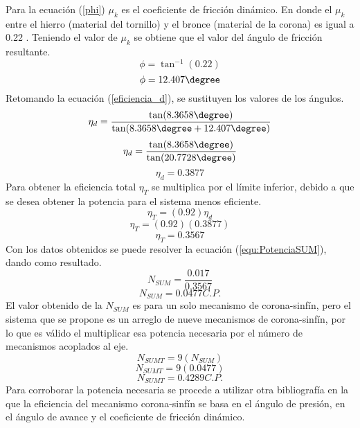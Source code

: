 Para la ecuación (\ref{phi})\hfill\break
$\mu_k$ es el coeficiente de fricción dinámico.\hfill\break
En donde el $\mu_k$ entre el hierro (material del tornillo) y el bronce (material de la corona) es igual a 0.22 \cite{Norton2011}. Teniendo el valor de $\mu_k$ se obtiene que el valor del ángulo de fricción resultante.
\begin{equation*}
    \phi=\tan^{-1}(0.22)
\end{equation*}
\begin{equation*}
    \phi=12.407\degree
\end{equation*}
Retomando la ecuación (\ref{eficiencia_d}), se sustituyen los valores de los ángulos.
\begin{equation*}
    \eta_d=\frac{\tan(8.3658\degree)}{\tan(8.3658\degree+12.407\degree)}
\end{equation*}
\begin{equation*}
    \eta_d=\frac{\tan(8.3658\degree)}{\tan(20.7728\degree)}
\end{equation*}
\begin{equation*}
    \eta_d=0.3877
\end{equation*}
Para obtener la eficiencia total $\eta_T$ se multiplica por el límite inferior, debido a que se desea obtener la potencia para el sistema menos eficiente.
\begin{equation*}
    \eta_T=(0.92)\eta_d
\end{equation*}
\begin{equation*}
    \eta_T=(0.92)(0.3877)
\end{equation*}
\begin{equation*}
    \eta_T=0.3567
\end{equation*}
Con los datos obtenidos se puede resolver la ecuación (\ref{equ:PotenciaSUM}), dando como resultado.
\begin{equation*}
    N_{SUM}=\frac{0.017}{0.3567}
\end{equation*}
\begin{equation*}
    N_{SUM}=0.0477 C.P.
\end{equation*}
El valor obtenido de la $N_{SUM}$ es para un solo mecanismo de corona-sinfín, pero el sistema que se propone es un arreglo de nueve mecanismos de corona-sinfín, por lo que es válido el multiplicar esa potencia necesaria por el número de mecanismos acoplados al eje. 
\begin{equation*}
    N_{SUMT}=9(N_{SUM}) 
\end{equation*}
\begin{equation*}
    N_{SUMT}=9(0.0477) 
\end{equation*}
\begin{equation*}
    N_{SUMT}=0.4289 C.P. 
\end{equation*}
Para corroborar la potencia necesaria se procede a utilizar otra bibliografía en la que la eficiencia del mecanismo corona-sinfín se basa en el ángulo de presión, en el ángulo de avance y el coeficiente de fricción dinámico.

